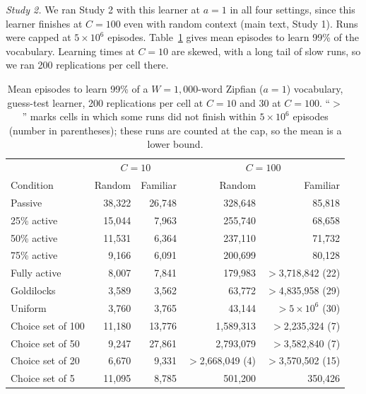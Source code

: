 \documentclass[11pt]{article}
\begin{document}
\textit{Study 2.} We ran Study 2 with this learner at $a=1$ in all four settings, since this learner finishes at $C=100$ even with random context (main text, Study 1). Runs were capped at $5 \times 10^6$ episodes. Table~\ref{tab-oracle} gives mean episodes to learn 99\% of the vocabulary. Learning times at $C=10$ are skewed, with a long tail of slow runs, so we ran 200 replications per cell there.

\begin{table}[h]
\centering
\caption{\label{tab-oracle} Mean episodes to learn 99\% of a $W=1{,}000$-word Zipfian ($a=1$) vocabulary, guess-test learner, 200 replications per cell at $C=10$ and 30 at $C=100$. ``$>$'' marks cells in which some runs did not finish within $5 \times 10^6$ episodes (number in parentheses); these runs are counted at the cap, so the mean is a lower bound.}
\small
\begin{tabular}{lrrrr}
\hline
 & \multicolumn{2}{c}{$C=10$} & \multicolumn{2}{c}{$C=100$} \\
Condition & Random & Familiar & Random & Familiar \\
\hline
Passive & 38{,}322 & 26{,}748 & 328{,}648 & 85{,}818 \\
25\% active & 15{,}044 & 7{,}963 & 255{,}740 & 68{,}658 \\
50\% active & 11{,}531 & 6{,}364 & 237{,}110 & 71{,}732 \\
75\% active & 9{,}166 & 6{,}091 & 200{,}699 & 80{,}128 \\
Fully active & 8{,}007 & 7{,}841 & 179{,}983 & $>$3{,}718{,}842 (22) \\
Goldilocks & 3{,}589 & 3{,}562 & 63{,}772 & $>$4{,}835{,}958 (29) \\
Uniform & 3{,}760 & 3{,}765 & 43{,}144 & $>5 \times 10^6$ (30) \\
Choice set of 100 & 11{,}180 & 13{,}776 & 1{,}589{,}313 & $>$2{,}235{,}324 (7) \\
Choice set of 50 & 9{,}247 & 27{,}861 & 2{,}793{,}079 & $>$3{,}582{,}840 (7) \\
Choice set of 20 & 6{,}670 & 9{,}331 & $>$2{,}668{,}049 (4) & $>$3{,}570{,}502 (15) \\
Choice set of 5 & 11{,}095 & 8{,}785 & 501{,}200 & 350{,}426 \\
\hline
\end{tabular}
\end{table}
\end{document}
